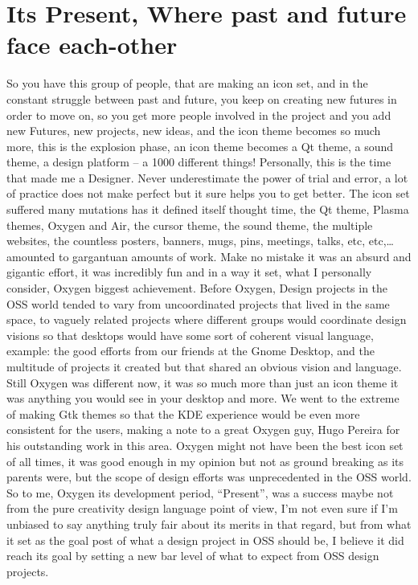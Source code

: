 \section*{Its Present, Where past and future face each-other}
So you have this group of people, that are making an icon set, and in the constant struggle between past and future, you keep on creating new futures in order to move on, so you get more people involved in the project and you add new Futures, new projects, new ideas, and the icon theme becomes so much more, this is the explosion phase, an icon theme becomes a Qt theme, a sound theme, a design platform – a 1000 different things! 
Personally, this is the time that made me a Designer. Never underestimate the power of trial and error, a lot of practice does not make perfect but it sure helps you to get better.
The icon set suffered many mutations has it defined itself thought time, the Qt theme, Plasma themes, Oxygen and Air, the cursor theme, the sound theme, the multiple websites, the countless posters, banners, mugs, pins, meetings, talks, etc, etc,… amounted to gargantuan amounts of work. 
Make no mistake it was an absurd and gigantic effort, it was incredibly fun and in a way it set, what I personally consider, Oxygen biggest achievement.
Before Oxygen, Design projects in the OSS world tended to vary from uncoordinated projects that lived in the same space, to vaguely related projects where different groups would coordinate design visions so that desktops would have some sort of coherent visual language, example: the good efforts from our friends at the Gnome Desktop, and the multitude of projects it created but that shared an obvious vision and language.
Still Oxygen was different now, it was so much more than just an icon theme it was anything you would see in your desktop and more. We went to the extreme of making Gtk themes so that the KDE experience would be even more consistent for the users, making a note to a great Oxygen guy, Hugo Pereira for his outstanding work in this area.
Oxygen might not have been the best icon set of all times, it was good enough in my opinion but not as ground breaking as its parents were, but the scope of design efforts was unprecedented in the OSS world. 
So to me, Oxygen its development period, “Present”,  was a success maybe not from the pure creativity design language point of view, I'm not even sure if I'm unbiased to say anything truly fair about its merits in that regard, but from what it set as the goal post of what a design project in OSS should be, I believe it did reach its goal by setting a new bar level of what to expect from OSS design projects.

